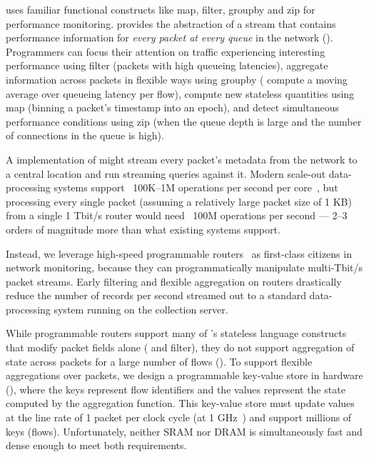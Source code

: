  \TheSystem uses familiar functional
constructs like {\ct map}, {\ct filter}, {\ct groupby} and {\ct zip} for
performance monitoring.
\TheSystem provides the abstraction of a stream that contains performance
information for {\em every packet at every queue} in the network
().
%
Programmers can focus their attention on traffic experiencing interesting
performance using {\ct filter} (\eg packets with high queueing latencies),
aggregate information across packets in flexible ways using {\ct groupby} (\eg
compute a moving average over queueing latency per flow), compute new stateless
quantities using {\ct map} (\eg binning a packet's timestamp into an epoch), and
detect simultaneous performance conditions using {\ct zip} (\eg when the queue
depth is large and the number of connections in the queue is high).

A \naive implementation of \TheSystem might stream every packet's
metadata from the network to a central location and run streaming queries
against it. Modern scale-out data-processing systems support ~100K--1M
operations per second per core~\cite{kafka_benchmark, redis_benchmark,
memcached_benchmark, redis_vs_memcached_update,
spark-streaming}, but processing every single packet (assuming a relatively
large packet size of 1 KB) from a single 1 Tbit/s router would need ~100M
operations per second --- 2--3 orders of magnitude more than what existing systems
support.

Instead, we leverage high-speed programmable routers~\cite{rmt, xpliant,
tofino, flexpipe} as first-class citizens in network monitoring, because they
can programmatically manipulate multi-Tbit/s packet streams.  Early filtering
and flexible aggregation on routers drastically reduce the number of records per
second streamed out to a standard data-processing system running on
the collection server.

While programmable routers support many of \TheSystem's stateless
language constructs that modify packet fields alone ( and {\ct
filter}), they do not support aggregation of state across packets for a large
number of flows (). To support flexible aggregations over
packets, we design a
programmable key-value store in hardware (), where the keys
represent flow identifiers and the values represent the state computed by the
aggregation function. This key-value store must
update values at the line rate of 1 packet per clock cycle (at 1
GHz~\cite{rmt, xpliant_sdk}) and support millions of keys (\ie flows).
Unfortunately, neither SRAM nor DRAM is simultaneously fast and dense
enough to meet both requirements.

